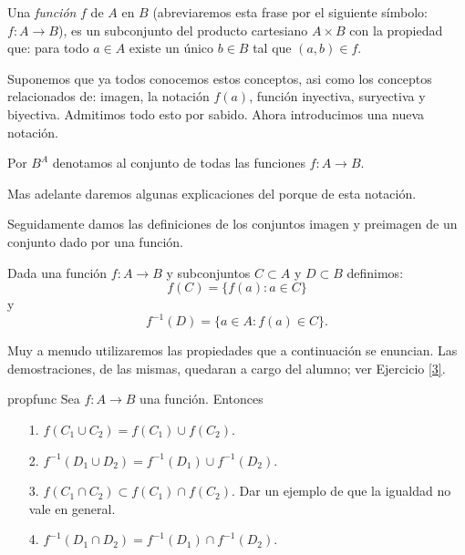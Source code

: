 \begin{definicion}{}  Una  \emph{función} $f$ de $A$ en $B$ (abreviaremos esta frase
por el siguiente símbolo: $f:A\longrightarrow B$), es un
subconjunto del producto cartesiano $A\times B$ con la propiedad
que: para todo $a\in A$ existe un único $b\in B$ tal que
$(a,b)\in f$. \end{definicion}

Suponemos que ya todos conocemos estos conceptos, asi como los
conceptos relacionados de: imagen, la notación $f(a)$, función
inyectiva, suryectiva y biyectiva. Admitimos todo esto por sabido.
Ahora introducimos una nueva notación.

\begin{definicion}{} 
Por $B^A$  denotamos al conjunto de todas las funciones
$f:A\longrightarrow B$.
\end{definicion}

Mas adelante daremos algunas explicaciones del porque de esta
notación.

Seguidamente damos las definiciones de los conjuntos imagen y preimagen de un conjunto dado por una función.

\begin{definicion}{}  Dada una función $f:A\longrightarrow B$ y subconjuntos
$C\subset A$ y $D\subset B$ definimos:
\[f(C)=\{f(a):a\in C\}\]
y
\[f^{-1}(D)=\{a\in A:f(a)\in C\}.\]
\end{definicion}











Muy a menudo utilizaremos las propiedades que a continuación se
enuncian. Las demostraciones, de las mismas, quedaran a cargo del
alumno; ver Ejercicio \vref{3}.

\begin{proposicion}{propfunc} Sea $f:A\longrightarrow B$ una función.
Entonces
\begin{itemize}
\item[1.] $f(C_1\cup C_2)=f(C_1)\cup f(C_2).$
\item[2.]$f^{-1}(D_1\cup D_2)= f^{-1}(D_1)\cup f^{-1}(D_2).$
\item[3.] $f(C_1\cap C_2)\subset f(C_1)\cap f(C_2).$ Dar un ejemplo de que la igualdad no vale en general.
\item[4.]$f^{-1}(D_1\cap D_2)= f^{-1}(D_1)\cap f^{-1}(D_2).$
\end{itemize}
\end{proposicion}



